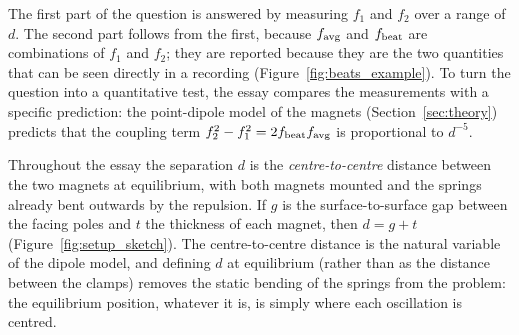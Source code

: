 The first part of the question is answered by measuring $f_1$ and $f_2$ over a range of $d$. The second part follows from the first, because $f_{\rm avg}$ and $f_{\rm beat}$ are combinations of $f_1$ and $f_2$; they are reported because they are the two quantities that can be seen directly in a recording (Figure~\ref{fig:beats_example}). To turn the question into a quantitative test, the essay compares the measurements with a specific prediction: the point-dipole model of the magnets (Section~\ref{sec:theory}) predicts that the coupling term $f_2^2-f_1^2=2f_{\rm beat}f_{\rm avg}$ is proportional to $d^{-5}$.

Throughout the essay the separation $d$ is the \emph{centre-to-centre} distance between the two magnets at equilibrium, with both magnets mounted and the springs already bent outwards by the repulsion. If $g$ is the surface-to-surface gap between the facing poles and $t$ the thickness of each magnet, then $d=g+t$ (Figure~\ref{fig:setup_sketch}). The centre-to-centre distance is the natural variable of the dipole model, and defining $d$ at equilibrium (rather than as the distance between the clamps) removes the static bending of the springs from the problem: the equilibrium position, whatever it is, is simply where each oscillation is centred.
